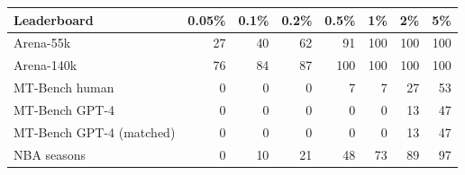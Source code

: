\begin{tabular}{lrrrrrrr}
\toprule
 Leaderboard & 0.05\% & 0.1\% & 0.2\% & 0.5\% & 1\% & 2\% & 5\% \\
\midrule
Arena-55k & 27 & 40 & 62 & 91 & 100 & 100 & 100 \\
Arena-140k & 76 & 84 & 87 & 100 & 100 & 100 & 100 \\
MT-Bench human & 0 & 0 & 0 & 7 & 7 & 27 & 53 \\
MT-Bench GPT-4 & 0 & 0 & 0 & 0 & 0 & 13 & 47 \\
MT-Bench GPT-4 (matched) & 0 & 0 & 0 & 0 & 0 & 13 & 47 \\
NBA seasons & 0 & 10 & 21 & 48 & 73 & 89 & 97 \\
\bottomrule
\end{tabular}
